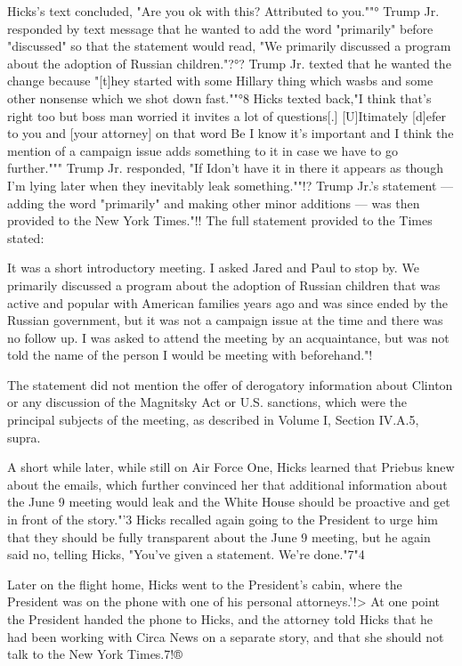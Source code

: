 Hicks's text concluded, "Are you ok with this? Attributed to you.""°
Trump Jr. responded by text message that he wanted to add the word "primarily" before "discussed" so that the statement would read, "We primarily discussed a program about the adoption of Russian children."?°?
Trump Jr. texted that he wanted the change because "[t]hey started with some Hillary thing which wasbs and some other nonsense which we shot down fast.""°8
Hicks texted back,"I think that's right too but boss man worried it invites a lot of questions[.]
[U]Itimately [d]efer to you and [your attorney] on that word Be I know it's important and I think the mention of a campaign issue adds something to it in case we have to go further."""
Trump Jr. responded, "If Idon't have it in there it appears as though I'm lying later when they inevitably leak something.""!?
Trump Jr.'s statement — adding the word "primarily" and making other minor additions — was then provided to the New York Times."!!
The full statement provided to the Times stated:

It was a short introductory meeting.
I asked Jared and Paul to stop by.
We primarily discussed a program about the adoption of Russian children that was active and popular with American families years ago and was since ended by the Russian government, but it was not a campaign issue at the time and there was no follow up.
I was asked to attend the meeting by an acquaintance, but was not told the name of the person I would be meeting with beforehand."!

The statement did not mention the offer of derogatory information about Clinton or any discussion of the Magnitsky Act or U.S. sanctions, which were the principal subjects of the meeting, as described in Volume I, Section IV.A.5, supra.

A short while later, while still on Air Force One, Hicks learned that Priebus knew about the emails, which further convinced her that additional information about the June 9 meeting would leak and the White House should be proactive and get in front of the story."'3
Hicks recalled again going to the President to urge him that they should be fully transparent about the June 9 meeting, but he again said no, telling Hicks, "You've given a statement.
We're done."7"4

Later on the flight home, Hicks went to the President's cabin, where the President was on the phone with one of his personal attorneys.'!>
At one point the President handed the phone to Hicks, and the attorney told Hicks that he had been working with Circa News on a separate story, and that she should not talk to the New York Times.7!®

